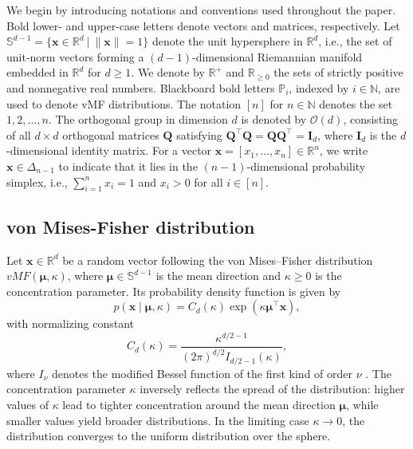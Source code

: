 \documentclass[10pt]{article}
\newcommand{\bfx}{\boldsymbol{x}}
\newcommand{\bfmu}{\boldsymbol{\mu}}
\newcommand{\bfQ}{\boldsymbol{Q}}
\newcommand{\bfI}{\boldsymbol{I}}
\newcommand{\bbN}{\mathbb{N}}
\newcommand{\bbP}{\mathbb{P}}
\newcommand{\bbR}{\mathbb{R}}
\newcommand{\bbS}{\mathbb{S}}
\newcommand{\bbRpos}{\mathbb{R}^+}
\begin{document}
We begin by introducing notations and conventions used throughout the paper. Bold lower- and upper-case letters denote vectors and matrices, respectively. Let $\bbS^{d-1} = \lbrace \bfx \in \bbR^d ~|~ \|\bfx\| = 1\rbrace$ denote the unit hypersphere in $\bbR^d$, i.e., the set of unit-norm vectors forming a $(d-1)$-dimensional Riemannian manifold embedded in $\bbR^d$ for $d \geq 1$. We denote by $\bbRpos$ and $\bbR_{\geq 0}$ the sets of strictly positive and nonnegative real numbers. Blackboard bold letters $\bbP_i$, indexed by $i \in \bbN$, are used to denote vMF distributions. The notation $[n]$ for $n \in \bbN$ denotes the set ${1, 2, \ldots, n}$. The orthogonal group in dimension $d$ is denoted by $\mathcal{O}(d)$, consisting of all $d \times d$ orthogonal matrices $\bfQ$ satisfying $\bfQ^\top \bfQ = \bfQ \bfQ^\top = \bfI_d$, where $\bfI_d$ is the $d$-dimensional identity matrix. For a vector $\bfx = [x_1, \ldots, x_n] \in \bbR^n$, we write $\bfx \in \Delta_{n-1}$ to indicate that it lies in the $(n-1)$-dimensional probability simplex, i.e., $\sum_{i=1}^n x_i = 1$ and $x_i > 0$ for all $i \in [n]$.


\subsection{von Mises-Fisher distribution}

Let $\bfx \in \bbR^d$ be a random vector following the von Mises–Fisher distribution $vMF(\bfmu, \kappa)$, where $\bfmu \in \bbS^{d-1}$ is the mean direction and $\kappa \geq 0$ is the concentration parameter. Its probability density function is given by \begin{equation}\label{definition:vMF} p(\bfx \mid \bfmu, \kappa) = C_d (\kappa) \exp \left( \kappa \bfmu^\top \bfx \right), \end{equation} with normalizing constant \begin{equation}\label{definition:normalizingconstant} C_d (\kappa) = \frac{\kappa^{d/2 - 1}}{(2\pi)^{d/2} I_{d/2 - 1}(\kappa)}, \end{equation} where $I_\nu$ denotes the modified Bessel function of the first kind of order $\nu$ \citep{abramowitz_1972_HandbookMathematicalFunctions}. The concentration parameter $\kappa$ inversely reflects the spread of the distribution: higher values of $\kappa$ lead to tighter concentration around the mean direction $\bfmu$, while smaller values yield broader distributions. In the limiting case $\kappa \to 0$, the distribution converges to the uniform distribution over the sphere.
\end{document}
